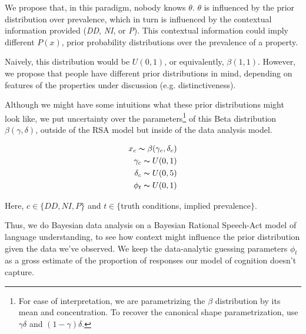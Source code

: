 \documentclass[10pt,letterpaper]{article}
\begin{document}
We propose that, in this paradigm, nobody knows $\theta$.  $\theta$ is influenced by the prior distribution over prevalence, which in turn is influenced by the contextual information provided (\emph{DD}, \emph{NI}, or \emph{P}). This contextual information could imply different $P(x)$, prior probability distributions over the prevalence of a property. 

Naively, this distribution would be $U(0,1)$, or equivalently, $\beta(1,1)$. However, we propose that people have different prior distributions in mind, depending on features of the properties under discussion (e.g. distinctiveness).

Although we might have some intuitions what these prior distributions might look like, we put uncertainty over the parameters\footnote{For ease of interpretation, we are parametrizing the $\beta$ distribution by its mean and concentration. To recover the canonical shape parametrization, use $\gamma \delta$ and $(1-\gamma)\delta$.} of this Beta distribution $\beta(\gamma,\delta)$, outside of the RSA model but inside of the data analysis model. 

\begin{align*}
x_{c} \thicksim \beta(\gamma_{c},\delta_{c}) \\
\gamma_{c} \thicksim U(0,1) \\
\delta_{c} \thicksim U(0,5) \\
\phi_{t} \thicksim U(0,1) 
\end{align*}

Here, $c \in \{DD,NI,P\}$ and $t \in \{$truth conditions, implied prevalence$\}$.

Thus, we do Bayesian data analysis on a Bayesian Rational Speech-Act model of language understanding, to see how context might influence the prior distribution given the data we've observed. We keep the data-analytic guessing parameters $\phi_{t}$ as a gross estimate of the proportion of responses our model of cognition doesn't capture. 
%	
%			
%			
%	
%				
%				
\end{document}
